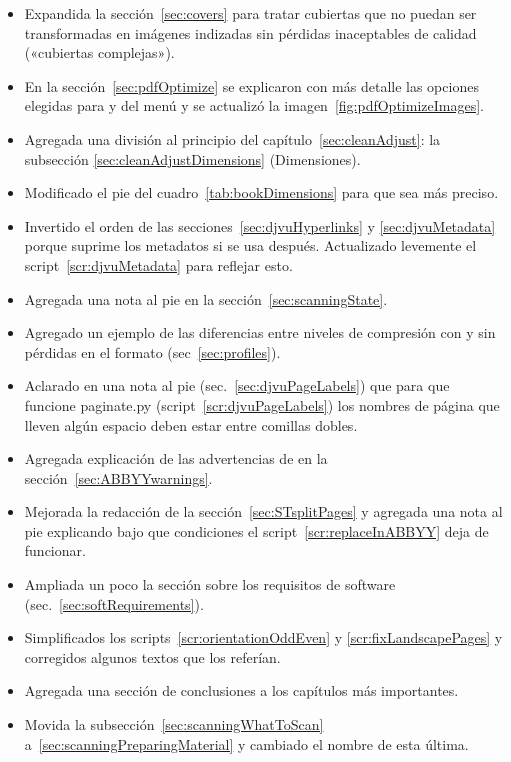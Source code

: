 \documentclass[%
	a5paper,
	10pt,
	twoside,
	openright,
	final,
]{memoir}
\begin{document}
{\begin{itemize}
\begin{itemize}
				\item Expandida la sección~\ref{sec:covers} para tratar cubiertas que no puedan ser transformadas en imágenes indizadas sin pérdidas inaceptables de calidad («cubiertas complejas»).
				\item En la sección~\ref{sec:pdfOptimize} se explicaron con más detalle las opciones elegidas para  y  del menú  y se actualizó la imagen~\ref{fig:pdfOptimizeImages}.
				\item Agregada una división al principio del capítulo~\ref{sec:cleanAdjust}: la subsección \ref{sec:cleanAdjustDimensions} (Dimensiones).
				\item Modificado el pie del cuadro~\ref{tab:bookDimensions} para que sea más preciso.
				\item Invertido el orden de las secciones~\ref{sec:djvuHyperlinks} y \ref{sec:djvuMetadata} porque \djvueditor suprime los metadatos si se usa después. Actualizado levemente el script~\ref{scr:djvuMetadata} para reflejar esto.
				\item Agregada una nota al pie en la sección~\ref{sec:scanningState}.
				\item Agregado un ejemplo de las diferencias entre niveles de compresión con y sin pérdidas en el formato \djvu (sec~\ref{sec:profiles}).
				\item Aclarado en una nota al pie (sec.~\ref{sec:djvuPageLabels}) que para que funcione paginate.py (script~\ref{scr:djvuPageLabels}) los nombres de página que lleven algún espacio deben estar entre comillas dobles.
				\item Agregada explicación de las advertencias de \abbyy en la sección~\ref{sec:ABBYYwarnings}.
				\item Mejorada la redacción de la sección~\ref{sec:STsplitPages} y agregada una nota al pie explicando bajo que condiciones el script~\ref{scr:replaceInABBYY} deja de funcionar.
				\item Ampliada un poco la sección sobre los requisitos de software (sec.~\ref{sec:softRequirements}).
				\item Simplificados los scripts~\ref{scr:orientationOddEven} y \ref{scr:fixLandscapePages} y corregidos algunos textos que los referían.
				\item Agregada una sección de conclusiones a los capítulos más importantes.
				\item Movida la subsección~\ref{sec:scanningWhatToScan} a~\ref{sec:scanningPreparingMaterial} y cambiado el nombre de esta última.

\end{itemize}
\end{itemize}}
\end{document}
